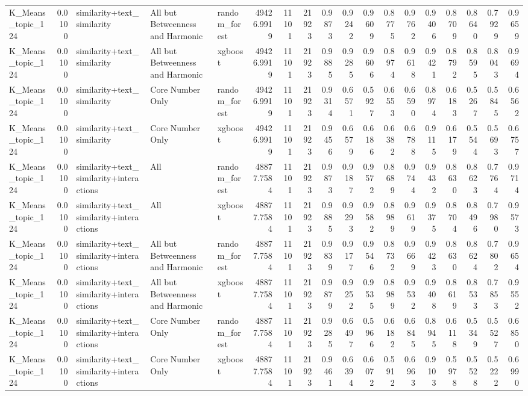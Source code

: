 \begin{tabular}{lrlllrrrrrrrrrrrrr}
K_Means_topic_124 & 0.0100 & similarity+text_similarity & All but Betweenness and Harmonic & random_forest & 49426.9919 & 11101 & 21923 & 0.9873 & 0.9242 & 0.9609 & 0.8775 & 0.9762 & 0.9406 & 0.8709 & 0.8640 & 0.7929 & 0.9659 \\
K_Means_topic_124 & 0.0100 & similarity+text_similarity & All but Betweenness and Harmonic & xgboost & 49426.9919 & 11101 & 21923 & 0.9885 & 0.9285 & 0.9606 & 0.8974 & 0.9618 & 0.9421 & 0.8792 & 0.8595 & 0.8043 & 0.9694 \\
K_Means_topic_124 & 0.0100 & similarity+text_similarity & Core Number Only & random_forest & 49426.9919 & 11101 & 21923 & 0.9314 & 0.6571 & 0.5927 & 0.6553 & 0.6590 & 0.8974 & 0.6183 & 0.5267 & 0.5845 & 0.6562 \\
K_Means_topic_124 & 0.0100 & similarity+text_similarity & Core Number Only & xgboost & 49426.9919 & 11101 & 21923 & 0.9456 & 0.6579 & 0.6186 & 0.6382 & 0.6788 & 0.9115 & 0.6179 & 0.5544 & 0.5693 & 0.6757 \\
K_Means_topic_124 & 0.0100 & similarity+text_similarity+interactions & All & random_forest & 48877.7584 & 11101 & 21923 & 0.9873 & 0.9187 & 0.9572 & 0.8689 & 0.9744 & 0.9432 & 0.8630 & 0.8623 & 0.7764 & 0.9714 \\
K_Means_topic_124 & 0.0100 & similarity+text_similarity+interactions & All & xgboost & 48877.7584 & 11101 & 21923 & 0.9885 & 0.9293 & 0.9582 & 0.8989 & 0.9619 & 0.9375 & 0.8704 & 0.8496 & 0.7980 & 0.9573 \\
K_Means_topic_124 & 0.0100 & similarity+text_similarity+interactions & All but Betweenness and Harmonic & random_forest & 48877.7584 & 11101 & 21923 & 0.9839 & 0.9177 & 0.9546 & 0.8732 & 0.9669 & 0.9423 & 0.8630 & 0.8624 & 0.7802 & 0.9654 \\
K_Means_topic_124 & 0.0100 & similarity+text_similarity+interactions & All but Betweenness and Harmonic & xgboost & 48877.7584 & 11101 & 21923 & 0.9879 & 0.9252 & 0.9535 & 0.8989 & 0.9532 & 0.9408 & 0.8619 & 0.8533 & 0.7853 & 0.9552 \\
K_Means_topic_124 & 0.0100 & similarity+text_similarity+interactions & Core Number Only & random_forest & 48877.7584 & 11101 & 21923 & 0.9285 & 0.6497 & 0.5966 & 0.6182 & 0.6845 & 0.8945 & 0.6118 & 0.5349 & 0.5527 & 0.6850 \\
K_Means_topic_124 & 0.0100 & similarity+text_similarity+interactions & Core Number Only & xgboost & 48877.7584 & 11101 & 21923 & 0.9461 & 0.6394 & 0.6072 & 0.5912 & 0.6963 & 0.9103 & 0.5978 & 0.5528 & 0.5222 & 0.6990 \\

\end{tabular}
